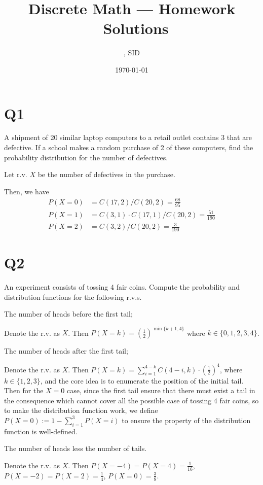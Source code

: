 \documentclass[11pt]{article}
\title{Discrete Math --- Homework \Homework \ Solutions}
\author{\Name, SID \SID}
\date{\today}
\begin{document}
\maketitle

\section*{Q1}
A shipment of 20 similar laptop computers to a retail outlet
contains 3 that are defective. If a school makes a random
purchase of 2 of these computers, ﬁnd the probability
distribution for the number of defectives.
\begin{solution}
    Let r.v. $X$ be the number of defectives
    in the purchase.

    Then, we have
    \begin{align*}
        P(X=0)&=C(17 , 2) / C(20 , 2)=\frac{68}{95} \\
        P(X=1)&=C(3 , 1)\cdot C(17 , 1) / C(20 , 2)=\frac{51}{190}\\
        P(X=2)&=C(3,2) / C(20 , 2) =\frac{3}{190} 
    \end{align*}

\end{solution}

\section*{Q2}
An experiment consists of tossing 4 fair coins. Compute the
probability and distribution functions for the following r.v.s.
\begin{qparts}
    
    \item The number of heads before the first tail;
    \begin{solution}
        Denote the r.v. as $X$. Then $P(X=k)=(\frac{1}{2})^{\min \{ k+1,4 \}}$ where 
        $k \in \{ 0,1,2,3,4 \}$.
    \end{solution}

    \item The number of heads after the first tail;
    \begin{solution}
        Denote the r.v. as $X$. 
        Then $P(X=k)=\sum_{i=1}^{4-k}C(4-i,k)\cdot (\frac{1}{2})^{4}$, where 
        $k \in \{ 1,2,3 \}$, and the core idea is to enumerate the position of the initial tail. Then for the $X=0$ case, since the first tail ensure that there must exist a tail in the consequence which cannot cover all the possible case of tossing 4 fair coins, so to make the distribution function work, we define $P(X=0):=1-\sum_{i=1}^{3}P(X=i)$ to ensure the property of the distribution function is well-defined.
    \end{solution}

    \item The number of heads less the number of tails.
    \begin{solution}
        Denote the r.v. as $X$. Then $P(X=-4)=P(X=4)=\frac{1}{16}$,
        $P(X=-2)=P(X=2)=\frac{1}{4}$, $P(X=0)=\frac{3}{8}$.
    \end{solution}
\end{qparts}
\end{document}
